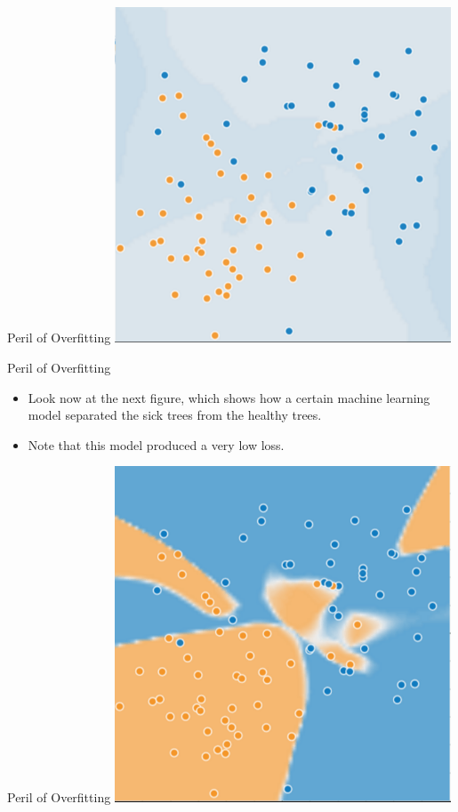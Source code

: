 \documentclass{beamer}
\begin{document}
\begin{frame}{Peril of Overfitting}
\includegraphics[width=0.75\textwidth]{images/GeneralizationA.png}
\end{frame}

\begin{frame}{Peril of Overfitting}
\begin{itemize}
\item Look now at the next figure, which shows how a certain machine learning model separated the sick trees from the healthy trees. 
\item Note that this model produced a very low loss.
\end{itemize}
\end{frame}

\begin{frame}{Peril of Overfitting}
\includegraphics[width=0.75\textwidth]{images/GeneralizationB.png}
\end{frame}
\end{document}
